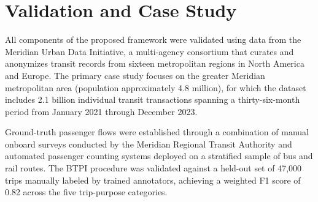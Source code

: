 \section{Validation and Case Study}

All components of the proposed framework were validated using data from the Meridian Urban Data Initiative, a multi-agency consortium that curates and anonymizes transit records from sixteen metropolitan regions in North America and Europe. The primary case study focuses on the greater Meridian metropolitan area (population approximately 4.8 million), for which the dataset includes 2.1 billion individual transit transactions spanning a thirty-six-month period from January 2021 through December 2023.

Ground-truth passenger flows were established through a combination of manual onboard surveys conducted by the Meridian Regional Transit Authority and automated passenger counting systems deployed on a stratified sample of bus and rail routes. The BTPI procedure was validated against a held-out set of 47,000 trips manually labeled by trained annotators, achieving a weighted F1 score of 0.82 across the five trip-purpose categories.

